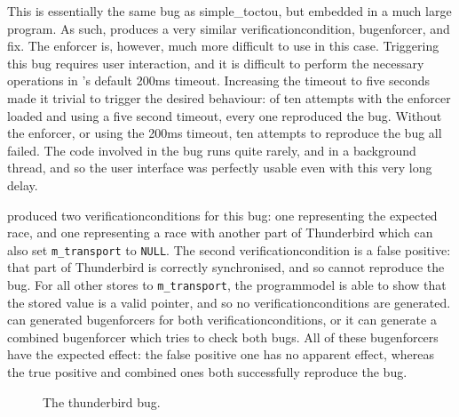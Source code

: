 This is essentially the same bug as simple\_toctou, but embedded in a
much large program.  As such, {\implementation} produces a very
similar \gls{verificationcondition}, \gls{bugenforcer}, and fix.  The
enforcer is, however, much more difficult to use in this case.
Triggering this bug requires user interaction, and it is difficult to
perform the necessary operations in {\implementation}'s default 200ms
timeout.  Increasing the timeout to five seconds made it trivial to
trigger the desired behaviour: of ten attempts with the enforcer
loaded and using a five second timeout, every one reproduced the bug.
Without the enforcer, or using the 200ms timeout, ten attempts to
reproduce the bug all failed.  The code involved in the bug runs quite
rarely, and in a background thread, and so the user interface was
perfectly usable even with this very long delay.

{\Implementation} produced two \glspl{verificationcondition} for this
bug: one representing the expected race, and one representing a race
with another part of Thunderbird which can also set
\texttt{m\_transport} to \texttt{NULL}.  The second
\gls{verificationcondition} is a false positive: that part of
Thunderbird is correctly synchronised, and so cannot reproduce the
bug.  For all other stores to \texttt{m\_transport}, the
\gls{programmodel} is able to show that the stored value is a valid
pointer, and so no \glspl{verificationcondition} are generated.
{\Implementation} can generated \glspl{bugenforcer} for both
\glspl{verificationcondition}, or it can generate a combined
\gls{bugenforcer} which tries to check both bugs.  All of these
\glspl{bugenforcer} have the expected effect: the false positive one
has no apparent effect, whereas the true positive and combined ones
both successfully reproduce the bug.

\begin{figure}
  \caption{The thunderbird bug.}
  \label{fig:eval:thunderbird}
\end{figure}

